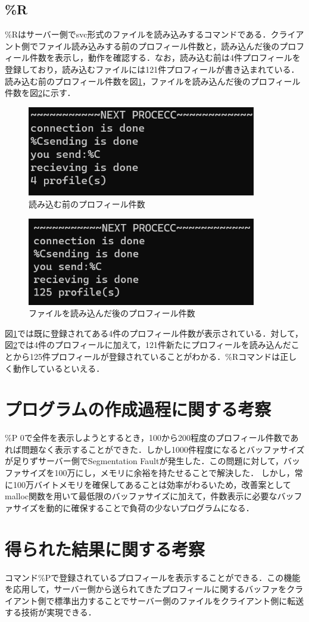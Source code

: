 \documentclass[11pt,a4j,titlepage]{jsarticle}
\begin{document}
\subsection{\%R}
\%Rはサーバー側でsvc形式のファイルを読み込みするコマンドである．クライアント側でファイル読み込みする前のプロフィール件数と，読み込んだ後のプロフィール件数を表示し，動作を確認する．なお，読み込む前は4件プロフィールを登録しており，読み込むファイルには121件プロフィールが書き込まれている．読み込む前のプロフィール件数を図\ref{fig:r}，ファイルを読み込んだ後のプロフィール件数を図\ref{fig:r121}に示す．
\begin{figure}[h]
\centering
\includegraphics[width=10cm]{pics/R4.png}
\caption{読み込む前のプロフィール件数}
\label{fig:r}\vspace{0zh}
\end{figure}
\begin{figure}[h]
\centering
\includegraphics[width=10cm]{pics/R121.png}
\caption{ファイルを読み込んだ後のプロフィール件数}
\label{fig:r121}\vspace{0zh}
\end{figure}

図\ref{fig:r}では既に登録されてある4件のプロフィール件数が表示されている．対して，図\ref{fig:r121}では4件のプロフィールに加えて，121件新たにプロフィールを読み込んだことから125件プロフィールが登録されていることがわかる．\%Rコマンドは正しく動作しているといえる．
\section{プログラムの作成過程に関する考察}
\%P 0で全件を表示しようとするとき，100から200程度のプロフィール件数であれば問題なく表示することができた．しかし1000件程度になるとバッファサイズが足りずサーバー側でSegmentation Faultが発生した．この問題に対して，バッファサイズを100万にし，メモリに余裕を持たせることで解決した．
しかし，常に100万バイトメモリを確保してあることは効率がわるいため，改善案としてmalloc関数を用いて最低限のバッファサイズに加えて，件数表示に必要なバッファサイズを動的に確保することで負荷の少ないプログラムになる．
\section{得られた結果に関する考察}
コマンド\%Pで登録されているプロフィールを表示することができる．この機能を応用して，サーバー側から送られてきたプロフィールに関するバッファをクライアント側で標準出力することでサーバー側のファイルをクライアント側に転送する技術が実現できる．
\end{document}
